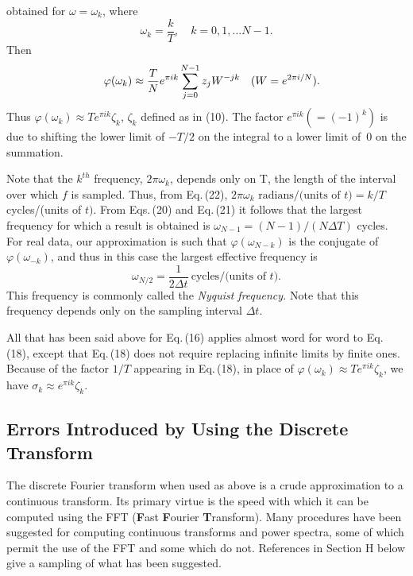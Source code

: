 \documentclass[twoside]{MATH77}
\begin{document}
obtained for $\omega =\omega _k$, where
\begin{equation}\label{O22}
\omega _k=\frac kT,\quad k=0,1,...N-1.
\end{equation}
Then
\begin{equation}\label{O23}
\varphi (\omega _k)\approx \frac TNe^{\pi
ik}\sum_{j=0}^{N-1}z_jW^{-jk}\quad (W=e^{2\pi i/N}).\hspace{-10pt}
\end{equation}
Thus $\varphi (\omega _k)\approx Te^{\pi ik}\zeta _k$, $\zeta _k$
defined as in (10). The factor $e^{\pi ik}(=(-1)^k)$ is due to
shifting the lower limit of $-T/2$ on the integral to a lower limit
of~0 on the summation.

Note that the $k^{th}$ frequency, $2 \pi \omega _k$, depends only on
T, the length of the interval over which $f$ is sampled. Thus, from
Eq.\,(22), $2 \pi \omega _k \text{ radians/(units of }t) =k/T$
cycles/(units of $t)$. From Eqs.\,(20) and Eq.\,(21) it follows that
the largest frequency for which a result is obtained is $\omega
_{N-1}=(N-1)/(N\Delta T)$ cycles.  For real data, our approximation
is such that $\varphi (\omega _{N-k})$ is the conjugate of $\varphi
(\omega _{-k})$, and thus in this case the largest effective
frequency is \begin{equation}\label{O24} \omega _{N/2}=\frac
1{2\Delta t}\ \text{cycles}/\text{(units of } t\text{).}
\end{equation} This frequency is commonly called the {\em Nyquist
frequency.} Note that this frequency depends only on the sampling
interval $\Delta t.$

All that has been said above for Eq.\,(16) applies almost word for
word to Eq.\,(18), except that Eq.\,(18) does not require replacing
infinite limits by finite ones. Because of the factor $1/T$ appearing
in Eq.\,(18), in place of $\varphi (\omega _k)\approx Te^{\pi
ik}\zeta _k$, we have $\sigma _k\approx e^{\pi ik}\zeta _k.$

\subsection{Errors Introduced by Using the Discrete Transform}

The discrete Fourier transform when used as above is a crude
approximation to a continuous transform. Its primary virtue is the
speed with which it can be computed using the FFT ({\bf F}ast {\bf
F}ourier {\bf T}ransform). Many procedures have been suggested for
computing continuous transforms and power spectra, some of which
permit the use of the FFT and some which do not.  References in
Section H below give a sampling of what has been suggested.
\end{document}
